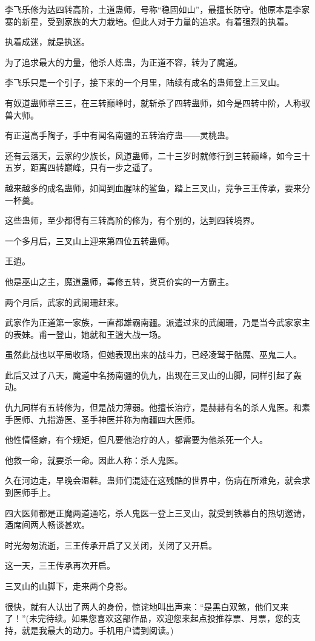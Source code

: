 \begin{this_body}
李飞乐修为达四转高阶，土道蛊师，号称“稳固如山”，最擅长防守。他原本是李家寨的新星，受到家族的大力栽培。但此人对于力量的追求。有着强烈的执着。

执着成迷，就是执迷。

为了追求最大的力量，他杀人炼蛊，为正道不容，转为了魔道。

李飞乐只是一个引子，接下来的一个月里，陆续有成名的蛊师登上三叉山。

有奴道蛊师章三三，在三转巅峰时，就斩杀了四转蛊师，如今是四转中阶，人称驭兽大师。

有正道高手陶子，手中有闻名南疆的五转治疗蛊——灵桃蛊。

还有云落天，云家的少族长，风道蛊师，二十三岁时就修行到三转巅峰，如今三十五岁，距离四转巅峰，只有一步之遥了。

越来越多的成名蛊师，如闻到血腥味的鲨鱼，踏上三叉山，竞争三王传承，要来分一杯羹。

这些蛊师，至少都得有三转高阶的修为，有个别的，达到四转境界。

一个多月后，三叉山上迎来第四位五转蛊师。

王逍。

他是巫山之主，魔道蛊师，毒修五转，货真价实的一方霸主。

两个月后，武家的武阑珊赶来。

武家作为正道第一家族，一直都雄霸南疆。派遣过来的武阑珊，乃是当今武家家主的表妹。甫一登山，她就和王逍大战一场。

虽然此战也以平局收场，但她表现出来的战斗力，已经凌驾于骷魔、巫鬼二人。

此后又过了八天，魔道中名扬南疆的仇九，出现在三叉山的山脚，同样引起了轰动。

仇九同样有五转修为，但是战力薄弱。他擅长治疗，是赫赫有名的杀人鬼医。和素手医师、九指游医、圣手神医并称为南疆四大医师。

他性情怪癖，有个规矩，但凡要他治疗的人，都需要为他杀死一个人。

他救一命，就要杀一命。因此人称：杀人鬼医。

久在河边走，早晚会湿鞋。蛊师们混迹在这残酷的世界中，伤病在所难免，就会求到医师手上。

四大医师都是正魔两道通吃，杀人鬼医一登上三叉山，就受到铁慕白的热切邀请，酒席间两人畅谈甚欢。

时光匆匆流逝，三王传承开启了又关闭，关闭了又开启。

这一天，三王传承再次开启。

三叉山的山脚下，走来两个身影。

很快，就有人认出了两人的身份，惊诧地叫出声来：“是黑白双煞，他们又来了！”(未完待续。如果您喜欢这部作品，欢迎您来起点投推荐票、月票，您的支持，就是我最大的动力。手机用户请到阅读。)

\end{this_body}

